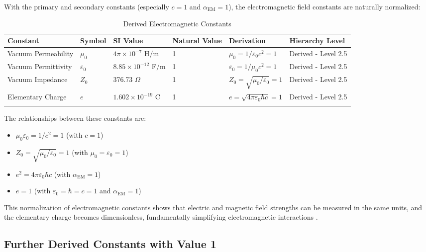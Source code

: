 \documentclass[12pt,a4paper]{article}
\newcommand{\alphaEM}{\alpha_{\text{EM}}}
\begin{document}
	With the primary and secondary constants (especially $c = 1$ and $\alphaEM = 1$), the electromagnetic field constants are naturally normalized:
	
	\begin{table}[h]
		\centering
		\begin{adjustbox}{scale=0.7}
			\begin{tabular}{llllll}
				\hline
				\textbf{Constant} & \textbf{Symbol} & \textbf{SI Value} & \textbf{Natural Value} & \textbf{Derivation} & \textbf{Hierarchy Level} \\
				\hline
				Vacuum Permeability & $\mu_0$ & $4\pi \times 10^{-7}$ H/m & 1 & $\mu_0 = 1/\varepsilon_0c^2 = 1$ & Derived - Level 2.5 \\
				Vacuum Permittivity & $\varepsilon_0$ & $8.85 \times 10^{-12}$ F/m & 1 & $\varepsilon_0 = 1/\mu_0c^2 = 1$ & Derived - Level 2.5 \\
				Vacuum Impedance & $Z_0$ & 376.73 $\Omega$ & 1 & $Z_0 = \sqrt{\mu_0/\varepsilon_0} = 1$ & Derived - Level 2.5 \\
				Elementary Charge & $e$ & $1.602 \times 10^{-19}$ C & 1 & $e = \sqrt{4\pi\varepsilon_0\hbar c} = 1$ & Derived - Level 2.5 \\
				\hline
				\multicolumn{5}{c}{} \\
				\hline
			\end{tabular}
		\end{adjustbox}
		\caption{Derived Electromagnetic Constants}
		\label{tab:em_const}
	\end{table}
	
	The relationships between these constants are:
	\begin{itemize}
		\item $\mu_0\varepsilon_0 = 1/c^2 = 1$ (with $c = 1$)
		\item $Z_0 = \sqrt{\mu_0/\varepsilon_0} = 1$ (with $\mu_0 = \varepsilon_0 = 1$)
		\item $e^2 = 4\pi\varepsilon_0\hbar c$ (with $\alphaEM = 1$)
		\item $e = 1$ (with $\varepsilon_0 = \hbar = c = 1$ and $\alphaEM = 1$)
	\end{itemize}
	
	This normalization of electromagnetic constants shows that electric and magnetic field strengths can be measured in the same units, and the elementary charge becomes dimensionless, fundamentally simplifying electromagnetic interactions \cite{pascher_alpha_2025}.
	
	\subsection{Further Derived Constants with Value 1}
	
\end{document}
